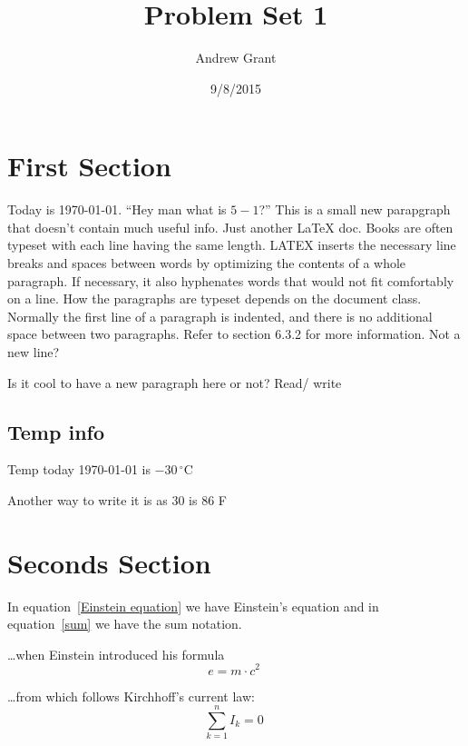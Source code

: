 \documentclass{article}
\title{Problem Set 1}
\author{Andrew Grant}
\date{9/8/2015}
\begin{document}
\maketitle

\section{First Section}

Today is \today. \newline
``Hey man what is $5 - 1$?''\newline
This is a small new parapgraph that doesn't contain much useful info. Just another \LaTeX{} doc.
Books are often typeset with each line having the same length. LATEX 
inserts the necessary line breaks and spaces between words by optimizing the contents of a whole paragraph. If necessary, it also hyphenates words that would not fit comfortably on a line. How the paragraphs are typeset depends on the document class. Normally the first line of a paragraph is indented, and there is no additional space between two paragraphs. Refer to section 6.3.2 for more information.
Not a new line?

Is it cool to have a new paragraph here or not? Read\slash{} write

\subsection{Temp info}

Temp today  \today{} is $-30\, ^{\circ}\mathrm{C}$

Another way to write it is as 30 \textcelsius{} is 86 \textdegree{}F

\section{Seconds Section}

In equation~\ref{Einstein equation} we have Einstein's equation and in equation~\ref{sum} we have the sum notation.

\ldots when Einstein introduced his formula
\begin{equation}
e = m \cdot c^2 \;
\label{Einstein equation}
\end{equation}

\ldots from which follows Kirchhoff's current law:
\begin{equation}
\sum_{k=1}^{n} I_k = 0\;
\label{sum}
\end{equation}
\end{document}
